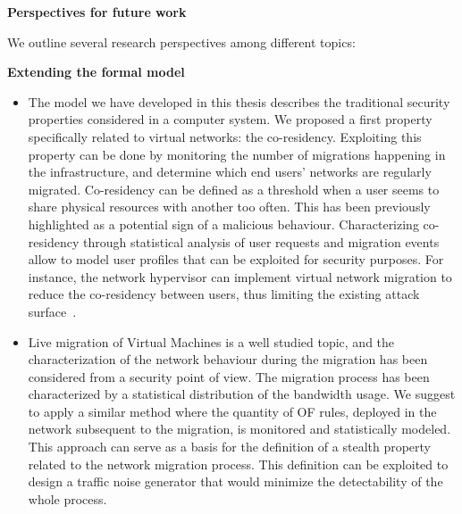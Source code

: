 \newpage
\textbf{Perspectives for future work\\}

We outline several research perspectives among different topics: 

\textbf{Extending the formal model}
\begin{itemize}
    \item 
    The model we have developed in this thesis describes the traditional security properties considered in a computer system. We proposed a first property specifically related to virtual networks: the co-residency. Exploiting this property can be done by monitoring the number of migrations happening in the infrastructure, and determine which end users' networks are regularly migrated. Co-residency can be defined as a threshold when a user seems to share physical resources with another too often. This has been previously highlighted as a potential sign of a malicious behaviour. Characterizing co-residency through statistical analysis of user requests and migration events allow to model user profiles that can be exploited for security purposes. For instance, the network hypervisor can implement virtual network migration to reduce the co-residency between users, thus limiting the existing attack surface~\cite{nomad-Moon2015b,malicious-atya2017}.

    \item 
    Live migration of Virtual Machines is a well studied topic, and the characterization of the network behaviour during the migration has been considered from a security point of view.
    The migration process has been characterized by a statistical distribution of the bandwidth usage.
    We suggest to apply a similar method where the quantity of OF rules, deployed in the network subsequent to the migration, is monitored and statistically modeled. This approach can serve as a basis for the definition of a stealth property related to the network migration process. This definition can be exploited to design a traffic noise generator that would minimize the detectability of the whole process.



\end{itemize}
